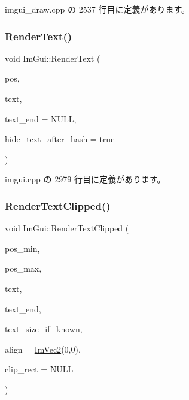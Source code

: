  imgui\+\_\+draw.\+cpp の 2537 行目に定義があります。

\mbox{\label{namespace_im_gui_a9971ce57f2a288ac3a12df886c5550d1}} 
\subsubsection{\texorpdfstring{Render\+Text()}{RenderText()}}
{\footnotesize\ttfamily void Im\+Gui\+::\+Render\+Text (\begin{DoxyParamCaption}\item[{\mbox{\hyperlink{struct_im_vec2}{Im\+Vec2}}}]{pos,  }\item[{const char $\ast$}]{text,  }\item[{const char $\ast$}]{text\+\_\+end = {\ttfamily NULL},  }\item[{bool}]{hide\+\_\+text\+\_\+after\+\_\+hash = {\ttfamily true} }\end{DoxyParamCaption})}



 imgui.\+cpp の 2979 行目に定義があります。

\mbox{\label{namespace_im_gui_ab362eafae794c7364a6b96ea06f38eb9}} 
\subsubsection{\texorpdfstring{Render\+Text\+Clipped()}{RenderTextClipped()}}
{\footnotesize\ttfamily void Im\+Gui\+::\+Render\+Text\+Clipped (\begin{DoxyParamCaption}\item[{const \mbox{\hyperlink{struct_im_vec2}{Im\+Vec2}} \&}]{pos\+\_\+min,  }\item[{const \mbox{\hyperlink{struct_im_vec2}{Im\+Vec2}} \&}]{pos\+\_\+max,  }\item[{const char $\ast$}]{text,  }\item[{const char $\ast$}]{text\+\_\+end,  }\item[{const \mbox{\hyperlink{struct_im_vec2}{Im\+Vec2}} $\ast$}]{text\+\_\+size\+\_\+if\+\_\+known,  }\item[{const \mbox{\hyperlink{struct_im_vec2}{Im\+Vec2}} \&}]{align = {\ttfamily \mbox{\hyperlink{struct_im_vec2}{Im\+Vec2}}(0,0)},  }\item[{const \mbox{\hyperlink{struct_im_rect}{Im\+Rect}} $\ast$}]{clip\+\_\+rect = {\ttfamily NULL} }\end{DoxyParamCaption})}



